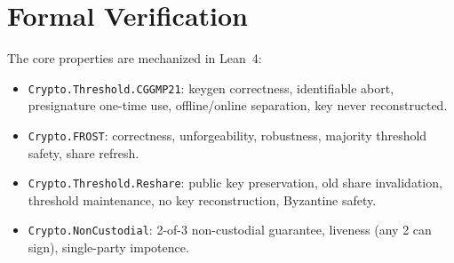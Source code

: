 \section{Formal Verification}

\label{sec:formal}

The core properties are mechanized in Lean~4:

\begin{itemize}[nosep]
  \item \texttt{Crypto.Threshold.CGGMP21}: keygen correctness,
        identifiable abort, presignature one-time use, offline/online
        separation, key never reconstructed.
  \item \texttt{Crypto.FROST}: correctness, unforgeability, robustness,
        majority threshold safety, share refresh.
  \item \texttt{Crypto.Threshold.Reshare}: public key preservation,
        old share invalidation, threshold maintenance, no key
        reconstruction, Byzantine safety.
  \item \texttt{Crypto.NonCustodial}: 2-of-3 non-custodial guarantee,
        liveness (any 2 can sign), single-party impotence.
\end{itemize}

